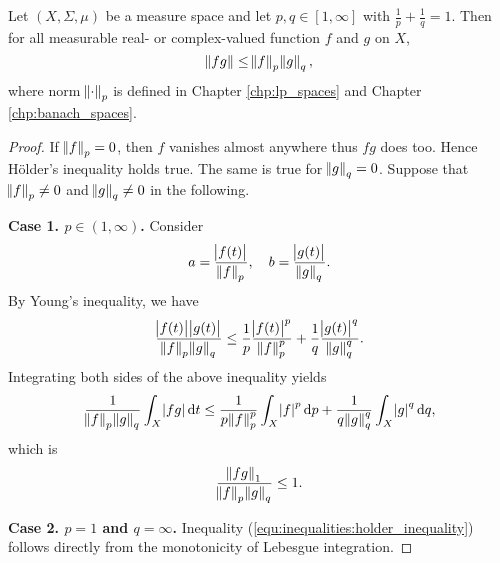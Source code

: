 \begin{thm}
Let $(X, \Sigma, \mu)$ be a measure space and let $p, q \in [1, \infty]$ 
with $\frac{1}{p} + \frac{1}{q} = 1$. 
Then for all measurable real- or complex-valued function $f$ and $g$ on $X$, 
\begin{equation*}
    \label{equ:inequalities:holder_inequality}
    \norm{fg} \le \norm{f}_p \norm{g}_q, 
\end{equation*}
where norm $\norm{\mathord{\cdot}}_p$ is defined in Chapter \ref{chp:lp_spaces} and 
Chapter \ref{chp:banach_spaces}.  
\end{thm}
\begin{proof}
If $\norm{f}_p = 0$, then $f$ vanishes almost anywhere thus $fg$ does too. 
Hence Hölder's inequality holds true. 
The same is true for $\norm{g}_q = 0$. 
Suppose that $\norm{f}_p \neq 0$ and $\norm{g}_q \neq 0$ in the following. 

\textbf{Case 1. $p \in (1, \infty)$. }
Consider 
\begin{equation*}
    a = \frac{\abs{f(t)}}{\norm{f}_p}, \quad 
    b = \frac{\abs{g(t)}}{\norm{g}_q}. 
\end{equation*}
By Young's inequality, we have 
\begin{equation*}
    \frac{\abs{f(t)} \abs{g(t)}}{\norm{f}_p \norm{g}_q} 
    \le \frac{1}{p} \frac{\abs{f(t)}^p}{\norm{f}_p^p} 
        + \frac{1}{q} \frac{\abs{g(t)}^q}{\norm{g}_q^q}. 
\end{equation*}
Integrating both sides of the above inequality yields 
\begin{equation*}
    \frac{1}{\norm{f}_p \norm{g}_q} \int_{X} \abs{f g} \mathop{}\!\mathrm{d} t 
    \le \frac{1}{p \norm{f}_p^p} \int_{X} \abs{f}^p \mathop{}\!\mathrm{d} p 
        + \frac{1}{q \norm{g}_q^q} \int_{X} \abs{g}^q \mathop{}\!\mathrm{d} q, 
\end{equation*}
which is 
\begin{equation*}
    \frac{\norm{fg}_1}{\norm{f}_p \norm{g}_q} \le 1. 
\end{equation*}

\textbf{Case 2. $p = 1$ and $q = \infty$. }
Inequality (\ref{equ:inequalities:holder_inequality}) follows directly from 
the monotonicity of Lebesgue integration. 
\end{proof}

